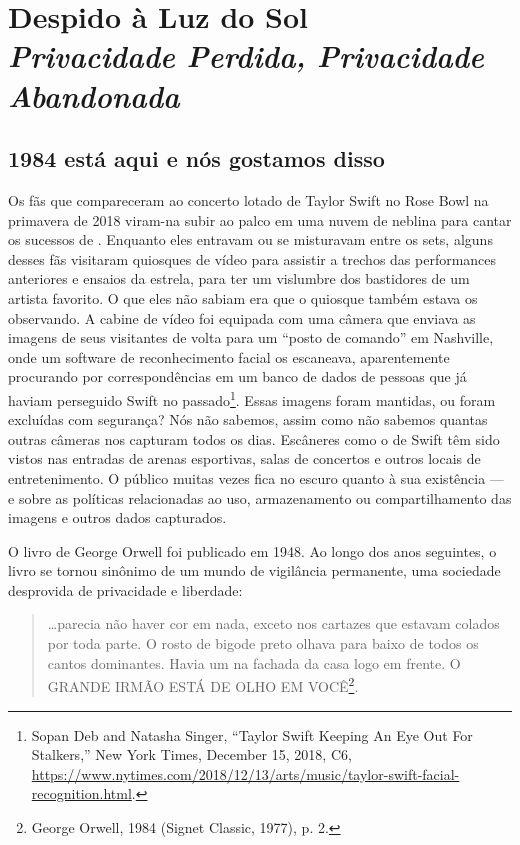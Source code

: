 \chapter[Despido à Luz do Sol]{Despido à Luz do Sol\\\large\textit{Privacidade
Perdida, Privacidade Abandonada}}
\label{despido}


\section{1984 está aqui e nós gostamos disso}
\label{despido:1984}

Os fãs que compareceram ao concerto lotado de Taylor Swift no Rose Bowl na
primavera de 2018 viram-na subir ao palco em uma nuvem de neblina para cantar os
sucessos de . Enquanto eles entravam ou se misturavam entre
os sets, alguns desses fãs visitaram quiosques de vídeo para assistir a trechos
das performances anteriores e ensaios da estrela, para ter um vislumbre dos
bastidores de um artista favorito. O que eles não sabiam era que o quiosque
também estava os observando. A cabine de vídeo foi equipada com uma câmera que
enviava as imagens de seus visitantes de volta para um ``posto de comando'' em
Nashville, onde um software de reconhecimento facial os escaneava, aparentemente
procurando por correspondências em um banco de dados de pessoas que já haviam
perseguido Swift no passado\footnote{Sopan Deb and Natasha Singer, ``Taylor
Swift Keeping An Eye Out For Stalkers,'' New York Times, December 15, 2018, C6,
\url{https://www.nytimes.com/2018/12/13/arts/music/taylor-swift-facial-recognition.html}.}.
Essas imagens foram mantidas, ou foram excluídas com segurança? Nós não sabemos,
assim como não sabemos quantas outras câmeras nos capturam todos os
dias. Escâneres como o de Swift têm sido vistos nas entradas de arenas
esportivas, salas de concertos e outros locais de entretenimento. O público
muitas vezes fica no escuro quanto à sua existência --- e sobre as políticas
relacionadas ao uso, armazenamento ou compartilhamento das imagens e outros
dados capturados.

O livro  de George Orwell foi publicado em 1948. Ao longo dos anos
seguintes, o livro se tornou sinônimo de um mundo de vigilância permanente, uma
sociedade desprovida de privacidade e liberdade:

\begin{quote}
\ldots parecia não haver cor em nada, exceto nos cartazes que estavam
colados por toda parte. O rosto de bigode preto olhava para baixo de
todos os cantos dominantes. Havia um na fachada da casa logo em frente.
O GRANDE IRMÃO ESTÁ DE OLHO EM VOCÊ\footnote{George Orwell, 1984 (Signet
Classic, 1977), p. 2.}.
\end{quote}

